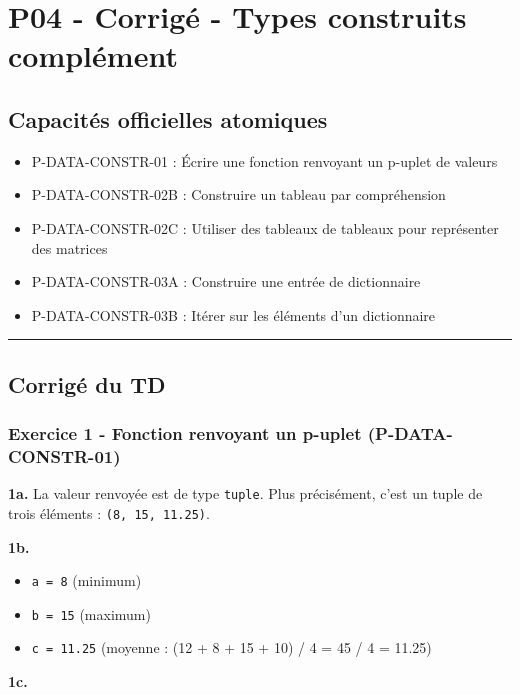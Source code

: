 \section{P04 - Corrigé - Types construits complément}

\subsection{Capacités officielles atomiques}

\begin{itemize}
\tightlist
\item
  P-DATA-CONSTR-01 : Écrire une fonction renvoyant un p-uplet de valeurs
\item
  P-DATA-CONSTR-02B : Construire un tableau par compréhension
\item
  P-DATA-CONSTR-02C : Utiliser des tableaux de tableaux pour représenter
  des matrices
\item
  P-DATA-CONSTR-03A : Construire une entrée de dictionnaire
\item
  P-DATA-CONSTR-03B : Itérer sur les éléments d'un dictionnaire
\end{itemize}

\begin{center}\rule{0.5\linewidth}{0.5pt}\end{center}

\subsection{Corrigé du TD}

\subsubsection{Exercice 1 - Fonction renvoyant un p-uplet (P-DATA-CONSTR-01)}

\textbf{1a.} La valeur renvoyée est de type \texttt{tuple}. Plus
précisément, c'est un tuple de trois éléments :
\texttt{(8,\ 15,\ 11.25)}.

\textbf{1b.}

\begin{itemize}
\tightlist
\item
  \texttt{a\ =\ 8} (minimum)
\item
  \texttt{b\ =\ 15} (maximum)
\item
  \texttt{c\ =\ 11.25} (moyenne : (12 + 8 + 15 + 10) / 4 = 45 / 4 =
  11.25)
\end{itemize}

\textbf{1c.}

